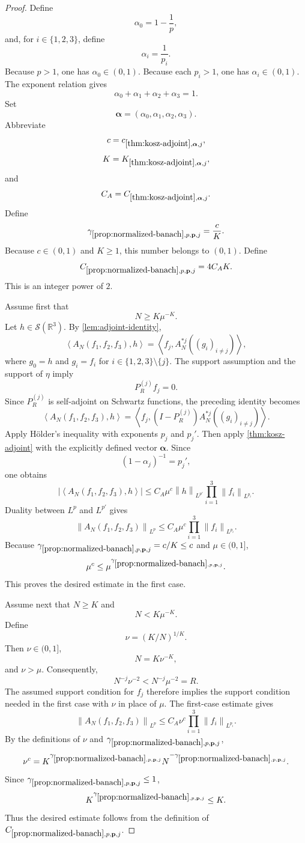 \documentclass[11pt]{article}
\newcommand{\R}{\mathbb{R}}
\newcommand{\Sch}{\mathcal{S}}
\newcommand{\ip}[2]{\left\langle #1,#2\right\rangle}
\newcommand{\norm}[2]{\left\lVert #1\right\rVert_{#2}}
\newcommand{\Cst}[2]{C_{\ref{#1},#2}}
\newcommand{\Gam}[2]{\gamma_{\ref{#1},#2}}
\newcommand{\Thr}[2]{K_{\ref{#1},#2}}
\newcommand{\abs}[1]{\left|#1\right|}
\newcommand{\indices}{\{1,2,3\}}
\begin{document}
	\begin{proof}
		Define
		\[
		\alpha_0=1-\frac1p,
		\]
		and, for \(i\in\indices\), define
		\[
		\alpha_i=\frac1{p_i}.
		\]
		Because \(p>1\), one has \(\alpha_0\in(0,1)\).  Because each \(p_i>1\), one has \(\alpha_i\in(0,1)\).  The exponent relation gives
		\[
		\alpha_0+\alpha_1+\alpha_2+\alpha_3=1.
		\]
		Set
		\[
		\boldsymbol\alpha=(\alpha_0,\alpha_1,\alpha_2,\alpha_3).
		\]
		Abbreviate
		\[
		c=c_{\ref{thm:kosz-adjoint},\boldsymbol\alpha,j},
		\]
		\[
		K=\Thr{thm:kosz-adjoint}{\boldsymbol\alpha,j},
		\]
		and
		\[
		C_A=\Cst{thm:kosz-adjoint}{\boldsymbol\alpha,j}.
		\]
		Define
		\[
		\Gam{prop:normalized-banach}{p,\mathbf p,j}=\frac cK.
		\]
		Because \(c\in(0,1)\) and \(K\geq1\), this number belongs to \((0,1)\).  Define
		\[
		\Cst{prop:normalized-banach}{p,\mathbf p,j}
		=
		4C_AK.
		\]
		This is an integer power of \(2\).
		
		Assume first that
		\[
		N\geq K\mu^{-K}.
		\]
		Let \(h\in\Sch(\R^3)\).  By \cref{lem:adjoint-identity},
		\[
		\ip{A_N(f_1,f_2,f_3)}{h}
		=
		\ip{f_j}{A_N^{*j}((g_i)_{i\neq j})},
		\]
		where \(g_0=h\) and \(g_i=f_i\) for \(i\in\indices\setminus\{j\}\).  The support assumption and the support of \(\eta\) imply
		\[
		P_R^{(j)}f_j=0.
		\]
		Since \(P_R^{(j)}\) is self-adjoint on Schwartz functions, the preceding identity becomes
		\[
		\ip{A_N(f_1,f_2,f_3)}{h}
		=
		\ip{f_j}{(I-P_R^{(j)})A_N^{*j}((g_i)_{i\neq j})}.
		\]
		Apply H\"older's inequality with exponents \(p_j\) and \(p_j'\).  Then apply \cref{thm:kosz-adjoint} with the explicitly defined vector \(\boldsymbol\alpha\).  Since
		\[
		(1-\alpha_j)^{-1}=p_j',
		\]
		one obtains
		\[
		\abs{\ip{A_N(f_1,f_2,f_3)}{h}}
		\leq
		C_A\mu^c
		\norm{h}{L^{p'}}
		\prod_{i=1}^{3}\norm{f_i}{L^{p_i}}.
		\]
		Duality between \(L^p\) and \(L^{p'}\) gives
		\[
		\norm{A_N(f_1,f_2,f_3)}{L^p}
		\leq
		C_A\mu^c
		\prod_{i=1}^{3}\norm{f_i}{L^{p_i}}.
		\]
		Because \(\Gam{prop:normalized-banach}{p,\mathbf p,j}=c/K\leq c\) and \(\mu\in(0,1]\),
		\[
		\mu^c\leq\mu^{\Gam{prop:normalized-banach}{p,\mathbf p,j}}.
		\]
		This proves the desired estimate in the first case.
		
		Assume next that \(N\geq K\) and
		\[
		N<K\mu^{-K}.
		\]
		Define
		\[
		\nu=(K/N)^{1/K}.
		\]
		Then \(\nu\in(0,1]\),
		\[
		N=K\nu^{-K},
		\]
		and \(\nu>\mu\).  Consequently,
		\[
		N^{-j}\nu^{-2}<N^{-j}\mu^{-2}=R.
		\]
		The assumed support condition for \(f_j\) therefore implies the support condition needed in the first case with \(\nu\) in place of \(\mu\).  The first-case estimate gives
		\[
		\norm{A_N(f_1,f_2,f_3)}{L^p}
		\leq
		C_A\nu^c
		\prod_{i=1}^{3}\norm{f_i}{L^{p_i}}.
		\]
		By the definitions of \(\nu\) and \(\Gam{prop:normalized-banach}{p,\mathbf p,j}\),
		\[
		\nu^c=K^{\Gam{prop:normalized-banach}{p,\mathbf p,j}}
		N^{-\Gam{prop:normalized-banach}{p,\mathbf p,j}}.
		\]
		Since \(\Gam{prop:normalized-banach}{p,\mathbf p,j}\leq1\),
		\[
		K^{\Gam{prop:normalized-banach}{p,\mathbf p,j}}\leq K.
		\]
		Thus the desired estimate follows from the definition of \(\Cst{prop:normalized-banach}{p,\mathbf p,j}\).
		

\end{proof}
\end{document}

